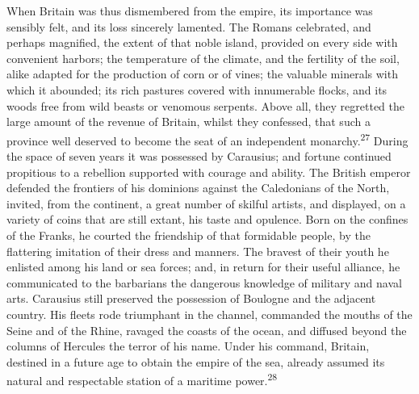 
When Britain was thus dismembered from the empire, its importance
was sensibly felt, and its loss sincerely lamented. The Romans
celebrated, and perhaps magnified, the extent of that noble
island, provided on every side with convenient harbors; the
temperature of the climate, and the fertility of the soil, alike
adapted for the production of corn or of vines; the valuable
minerals with which it abounded; its rich pastures covered with
innumerable flocks, and its woods free from wild beasts or
venomous serpents. Above all, they regretted the large amount of
the revenue of Britain, whilst they confessed, that such a
province well deserved to become the seat of an independent
monarchy.\textsuperscript{27} During the space of seven years it was possessed by
Carausius; and fortune continued propitious to a rebellion
supported with courage and ability. The British emperor defended
the frontiers of his dominions against the Caledonians of the
North, invited, from the continent, a great number of skilful
artists, and displayed, on a variety of coins that are still
extant, his taste and opulence. Born on the confines of the
Franks, he courted the friendship of that formidable people, by
the flattering imitation of their dress and manners. The bravest
of their youth he enlisted among his land or sea forces; and, in
return for their useful alliance, he communicated to the
barbarians the dangerous knowledge of military and naval arts.
Carausius still preserved the possession of Boulogne and the
adjacent country. His fleets rode triumphant in the channel,
commanded the mouths of the Seine and of the Rhine, ravaged the
coasts of the ocean, and diffused beyond the columns of Hercules
the terror of his name. Under his command, Britain, destined in a
future age to obtain the empire of the sea, already assumed its
natural and respectable station of a maritime power.\textsuperscript{28}



